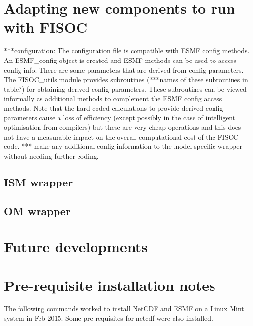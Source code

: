 \documentclass[12pt]{article}
\begin{document}
\section{Adapting new components to run with  FISOC}
\label{sec:FISOC_SDG}


***configuration:
The configuration file is compatible with ESMF config methods.  
An ESMF\_config object is created and ESMF methods can be used to access config info.
There are some parameters that are derived from config parameters.  
The FISOC\_utils module provides subroutines (***names of these subroutines in table?) 
for obtaining derived config parameters.
These subroutines can be viewed informally as additional methods to complement the ESMF config access methods. 
Note that the hard-coded calculations to provide derived config parameters cause a loss of 
efficiency (except possibly in the case of intelligent optimisation from compilers) but these 
are very cheap operations and this does not have a measurable impact on the overall 
computational cost of the FISOC code.
*** make any additional config information to the model specific wrapper without needing further coding.

\subsection{ISM wrapper}

\subsection{OM wrapper}

\section{Future developments}

\appendix

\section{Pre-requisite installation notes}
\label{app:A}
The following commands worked to install NetCDF and ESMF on a Linux Mint system in Feb 2015.
Some pre-requisites for netcdf were also installed.
\end{document}
